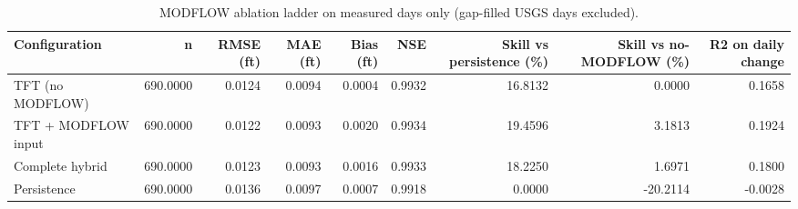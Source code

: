 \begin{table}[htbp]
\centering
\caption{MODFLOW ablation ladder on measured days only (gap-filled USGS days excluded).}
\label{tab:ablation_test_measured}
\begin{tabular}{lrrrrrrrr}
\hline
Configuration & n & RMSE (ft) & MAE (ft) & Bias (ft) & NSE & Skill vs persistence (\%) & Skill vs no-MODFLOW (\%) & R2 on daily change \\
\hline
TFT (no MODFLOW) & 690.0000 & 0.0124 & 0.0094 & 0.0004 & 0.9932 & 16.8132 & 0.0000 & 0.1658 \\
TFT + MODFLOW input & 690.0000 & 0.0122 & 0.0093 & 0.0020 & 0.9934 & 19.4596 & 3.1813 & 0.1924 \\
Complete hybrid & 690.0000 & 0.0123 & 0.0093 & 0.0016 & 0.9933 & 18.2250 & 1.6971 & 0.1800 \\
Persistence & 690.0000 & 0.0136 & 0.0097 & 0.0007 & 0.9918 & 0.0000 & -20.2114 & -0.0028 \\
\hline
\end{tabular}
\end{table}